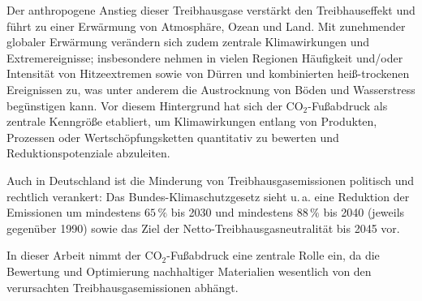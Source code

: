 Der anthropogene Anstieg dieser Treibhausgase verstärkt den Treibhauseffekt und führt zu einer Erwärmung von Atmosphäre, Ozean und Land. \cite{ipcc_ar6_wgi_spm}
Mit zunehmender globaler Erwärmung verändern sich zudem zentrale Klimawirkungen und Extremereignisse; insbesondere nehmen in vielen Regionen Häufigkeit und/oder Intensität von Hitzeextremen sowie von Dürren und kombinierten heiß-trockenen Ereignissen zu, was unter anderem die Austrocknung von Böden und Wasserstress begünstigen kann. \cite{ipcc_ar6_wgi_spm,ipcc_ar6_wgi_ch11}
Vor diesem Hintergrund hat sich der \(\mathrm{CO_2}\)-Fußabdruck als zentrale Kenngröße etabliert, um Klimawirkungen entlang von Produkten, Prozessen oder Wertschöpfungsketten quantitativ zu bewerten und Reduktionspotenziale abzuleiten. \cite{ipcc_ar6_syr_spm}

Auch in Deutschland ist die Minderung von Treibhausgasemissionen politisch und rechtlich verankert: Das Bundes-Klimaschutzgesetz sieht u.\,a. eine Reduktion der Emissionen um mindestens \(65\,\%\) bis 2030 und mindestens \(88\,\%\) bis 2040 (jeweils gegenüber 1990) sowie das Ziel der Netto-Treibhausgasneutralität bis 2045 vor. \cite{bmukn_ksg,uba_minderungsziele}

In dieser Arbeit nimmt der \(\mathrm{CO_2}\)-Fußabdruck eine zentrale Rolle ein, da die Bewertung und Optimierung nachhaltiger Materialien wesentlich von den verursachten Treibhausgasemissionen abhängt.

\cite{gutowski2013global}
\cite{davis2011supply}


